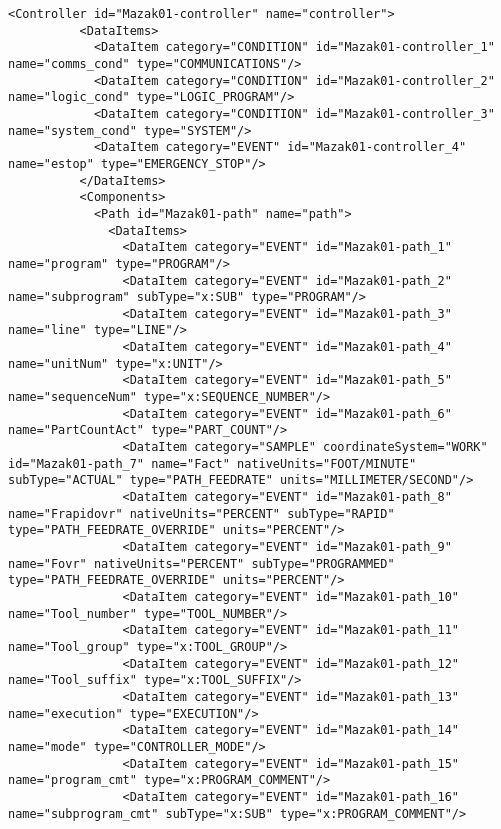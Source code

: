\begin{lstlisting}[firstnumber=last,%
    caption={Controller and Path Components and Their Data Items},label={lst:controller-component}]
        <Controller id="Mazak01-controller" name="controller">
          <DataItems>
            <DataItem category="CONDITION" id="Mazak01-controller_1" name="comms_cond" type="COMMUNICATIONS"/>
            <DataItem category="CONDITION" id="Mazak01-controller_2" name="logic_cond" type="LOGIC_PROGRAM"/>
            <DataItem category="CONDITION" id="Mazak01-controller_3" name="system_cond" type="SYSTEM"/>
            <DataItem category="EVENT" id="Mazak01-controller_4" name="estop" type="EMERGENCY_STOP"/>
          </DataItems>
          <Components>
            <Path id="Mazak01-path" name="path">
              <DataItems>
                <DataItem category="EVENT" id="Mazak01-path_1" name="program" type="PROGRAM"/>
                <DataItem category="EVENT" id="Mazak01-path_2" name="subprogram" subType="x:SUB" type="PROGRAM"/>
                <DataItem category="EVENT" id="Mazak01-path_3" name="line" type="LINE"/>
                <DataItem category="EVENT" id="Mazak01-path_4" name="unitNum" type="x:UNIT"/>
                <DataItem category="EVENT" id="Mazak01-path_5" name="sequenceNum" type="x:SEQUENCE_NUMBER"/>
                <DataItem category="EVENT" id="Mazak01-path_6" name="PartCountAct" type="PART_COUNT"/>
                <DataItem category="SAMPLE" coordinateSystem="WORK" id="Mazak01-path_7" name="Fact" nativeUnits="FOOT/MINUTE" subType="ACTUAL" type="PATH_FEEDRATE" units="MILLIMETER/SECOND"/>
                <DataItem category="EVENT" id="Mazak01-path_8" name="Frapidovr" nativeUnits="PERCENT" subType="RAPID" type="PATH_FEEDRATE_OVERRIDE" units="PERCENT"/>
                <DataItem category="EVENT" id="Mazak01-path_9" name="Fovr" nativeUnits="PERCENT" subType="PROGRAMMED" type="PATH_FEEDRATE_OVERRIDE" units="PERCENT"/>
                <DataItem category="EVENT" id="Mazak01-path_10" name="Tool_number" type="TOOL_NUMBER"/>
                <DataItem category="EVENT" id="Mazak01-path_11" name="Tool_group" type="x:TOOL_GROUP"/>
                <DataItem category="EVENT" id="Mazak01-path_12" name="Tool_suffix" type="x:TOOL_SUFFIX"/>
                <DataItem category="EVENT" id="Mazak01-path_13" name="execution" type="EXECUTION"/>
                <DataItem category="EVENT" id="Mazak01-path_14" name="mode" type="CONTROLLER_MODE"/>
                <DataItem category="EVENT" id="Mazak01-path_15" name="program_cmt" type="x:PROGRAM_COMMENT"/>
                <DataItem category="EVENT" id="Mazak01-path_16" name="subprogram_cmt" subType="x:SUB" type="x:PROGRAM_COMMENT"/>

\end{lstlisting}
